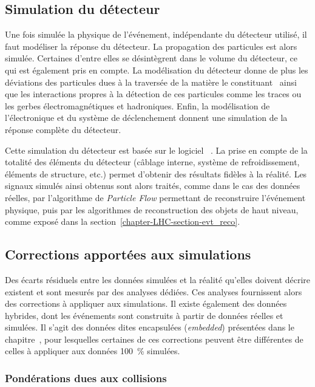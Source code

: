 \subsection{Simulation du détecteur}\label{chapter-LHC-section-MC-subsec-detector_sim}
Une fois simulée la physique de l'événement, indépendante du détecteur utilisé, il faut modéliser la réponse du détecteur.
La propagation des particules est alors simulée. %
Certaines d'entre elles se désintègrent dans le volume du détecteur, ce qui est également pris en compte.
La modélisation du détecteur donne de plus les déviations des particules dues à la traversée de la matière le constituant~\cite{moliere_scat_1,moliere_scat_2} ainsi que les interactions propres à la détection de ces particules comme les traces ou les gerbes électromagnétiques et hadroniques.
Enfin, la modélisation de l'électronique et du système de déclenchement donnent une simulation de la réponse complète du détecteur.%
\par
Cette simulation du détecteur est basée sur le logiciel
\GEANTfour~\cite{geant4_2003,geant4_2006,geant4_2016}.
La prise en compte de la totalité des éléments du détecteur (câblage interne, système de refroidissement, éléments de structure, etc.) permet d'obtenir des résultats fidèles à la réalité.
Les signaux simulés ainsi obtenus sont alors traités, comme dans le cas des données réelles, par l'algorithme de \emph{Particle Flow} permettant de reconstruire l'événement physique, puis par les algorithmes de reconstruction des objets de haut niveau, comme exposé dans la section~\ref{chapter-LHC-section-evt_reco}.
\subsection{Corrections apportées aux simulations}
Des écarts résiduels entre les données simulées et la réalité qu'elles doivent décrire existent et sont mesurés par des analyses dédiées.
Ces analyses fournissent alors des corrections à appliquer aux simulations.
Il existe également des données hybrides, dont les événements sont construits à partir de données réelles et simulées.
Il s'agit des données dites \og encapsulées \fg{} (\emph{embedded}) présentées dans le chapitre~, pour lesquelles certaines de ces corrections peuvent être différentes de celles à appliquer aux données \SI{100}{\%} simulées.
\subsubsection{Pondérations dues aux collisions}
